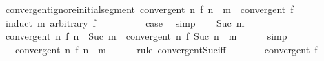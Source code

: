 \begin{isabellebody}
\endisatagproof
{\isafoldproof}%
%
\isadelimproof
\isanewline
%
\endisadelimproof
\isanewline
{}\isamarkupfalse%
\ convergent{\isacharunderscore}{\kern0pt}ignore{\isacharunderscore}{\kern0pt}initial{\isacharunderscore}{\kern0pt}segment{\isacharcolon}{\kern0pt}\ {\isachardoublequoteopen}convergent\ {\isacharparenleft}{\kern0pt}{\isasymlambda}n{\isachardot}{\kern0pt}\ f\ {\isacharparenleft}{\kern0pt}n\ {\isacharplus}{\kern0pt}\ m{\isacharparenright}{\kern0pt}{\isacharparenright}{\kern0pt}\ {\isacharequal}{\kern0pt}\ convergent\ f{\isachardoublequoteclose}\isanewline
%
\isadelimproof
%
\endisadelimproof
%
\isatagproof
{}\isamarkupfalse%
\ {\isacharparenleft}{\kern0pt}induct\ m\ arbitrary{\isacharcolon}{\kern0pt}\ f{\isacharparenright}{\kern0pt}\isanewline
\ \ \isamarkupfalse%
\ {}\isanewline
\ \ \isamarkupfalse%
\ \isamarkupfalse%
\ {\isacharquery}{\kern0pt}case\ \isamarkupfalse%
\ simp\isanewline
{}\isamarkupfalse%
\isanewline
\ \ \isamarkupfalse%
\ {\isacharparenleft}{\kern0pt}Suc\ m{\isacharparenright}{\kern0pt}\isanewline
\ \ \isamarkupfalse%
\ {\isachardoublequoteopen}convergent\ {\isacharparenleft}{\kern0pt}{\isasymlambda}n{\isachardot}{\kern0pt}\ f\ {\isacharparenleft}{\kern0pt}n\ {\isacharplus}{\kern0pt}\ Suc\ m{\isacharparenright}{\kern0pt}{\isacharparenright}{\kern0pt}\ {\isasymlongleftrightarrow}\ convergent\ {\isacharparenleft}{\kern0pt}{\isasymlambda}n{\isachardot}{\kern0pt}\ f\ {\isacharparenleft}{\kern0pt}Suc\ n\ {\isacharplus}{\kern0pt}\ m{\isacharparenright}{\kern0pt}{\isacharparenright}{\kern0pt}{\isachardoublequoteclose}\isanewline
\ \ \ \ \isamarkupfalse%
\ simp\isanewline
\ \ \isamarkupfalse%
\ \isamarkupfalse%
\ {\isachardoublequoteopen}{\isasymdots}\ {\isasymlongleftrightarrow}\ convergent\ {\isacharparenleft}{\kern0pt}{\isasymlambda}n{\isachardot}{\kern0pt}\ f\ {\isacharparenleft}{\kern0pt}n\ {\isacharplus}{\kern0pt}\ m{\isacharparenright}{\kern0pt}{\isacharparenright}{\kern0pt}{\isachardoublequoteclose}\isanewline
\ \ \ \ \isamarkupfalse%
\ {\isacharparenleft}{\kern0pt}rule\ convergent{\isacharunderscore}{\kern0pt}Suc{\isacharunderscore}{\kern0pt}iff{\isacharparenright}{\kern0pt}\isanewline
\ \ \isamarkupfalse%
\ \isamarkupfalse%
\ {\isachardoublequoteopen}{\isasymdots}\ {\isasymlongleftrightarrow}\ convergent\ f{\isachardoublequoteclose}\isanewline
\ \ \ \ \isamarkupfalse%

\end{isabellebody}
